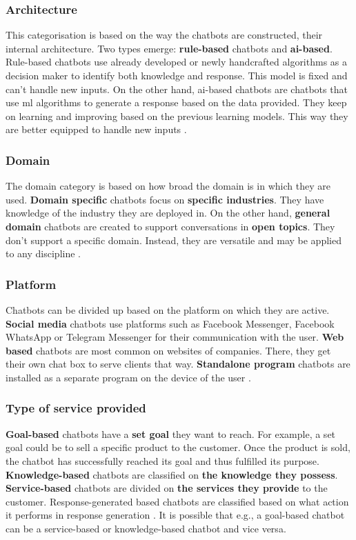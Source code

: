 \subsubsection{Architecture}
This categorisation is based on the way the chatbots are constructed, their internal architecture. Two types emerge: \textbf{rule-based} chatbots and \textbf{ai-based}. Rule-based chatbots use already developed or newly handcrafted algorithms as a decision maker to identify both knowledge and response. This model is fixed and can’t handle new inputs. On the other hand, \acrshort{ai}-based chatbots are chatbots that use \acrlong{ml} algorithms to generate a response based on the data provided. They keep on learning and improving based on the previous learning models. This way they are better equipped to handle new inputs \citep{Maroengsit2019}.\\

\subsubsection{Domain}
The domain category is based on how broad the domain is in which they are used. \textbf{Domain specific} chatbots focus on \textbf{specific industries}. They have knowledge of the industry they are deployed in. On the other hand, \textbf{general domain} chatbots are created to support conversations in \textbf{open topics}. They don’t support a specific domain. Instead, they are versatile and may be applied to any discipline \citep{Maroengsit2019}.\\

\subsubsection{Platform}
Chatbots can be divided up based on the platform on which they are active. \textbf{Social media} chatbots use platforms such as Facebook Messenger, Facebook WhatsApp or Telegram Messenger for their communication with the user. \textbf{Web based} chatbots are most common on websites of companies. There, they get their own chat box to serve clients that way. \textbf{Standalone program} chatbots are installed as a separate program on the device of the user \citep*{Maroengsit2019, Xu2017, CICBA2018}.\\

\subsubsection{Type of service provided}
\textbf{Goal-based} chatbots have a \textbf{set goal} they want to reach. For example, a set goal could be to sell a specific product to the customer. Once the product is sold, the chatbot has successfully reached its goal and thus fulfilled its purpose. \textbf{Knowledge-based} chatbots are classified on \textbf{the knowledge they possess}. \textbf{Service-based} chatbots are divided on \textbf{the services they provide} to the customer. Response-generated based chatbots are classified based on what action it performs in response generation \citep{Nuruzzaman2018}. It is possible that e.g., a goal-based chatbot can be a service-based or knowledge-based chatbot and vice versa.\\

